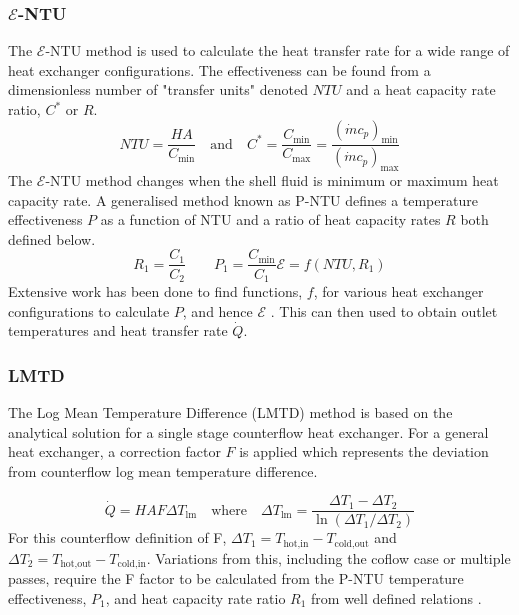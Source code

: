 \documentclass{article}
\begin{document}
\subsubsection{$\mathcal{E}$-NTU}
The $\mathcal{E}$-NTU method is used to calculate the heat transfer rate for a wide range of heat exchanger configurations.
The effectiveness can be found from a dimensionless number of "transfer units" denoted $NTU$ and a heat capacity rate ratio, $C^*$ or $R$.
\begin{equation}
  NTU = \frac{HA}{C_{\text{min}}} \quad \text{and} \quad C^* = \frac{C_{\text{min}}}{C_{\text{max}}} = \frac{(\dot{m}c_p)_{\text{min}}}{(\dot{m}c_p)_{\text{max}}}
\end{equation}
The $\mathcal{E}$-NTU method changes when the shell fluid is minimum or maximum heat capacity rate.
A generalised method known as P-NTU defines a temperature effectiveness $P$ as a function of NTU and a ratio of heat capacity rates $R$ both defined below.
\begin{equation}
   R_1 = \frac{C_1}{C_2} \quad \quad P_1 = \frac{C_\text{min}}{C_1} \mathcal{E} = f(NTU, R_1)
\end{equation}
Extensive work has been done to find functions, $f$, for various heat exchanger configurations to calculate $P$, and hence $\mathcal{E}$ \cite{HeatTransfer}.
This can then used to obtain outlet temperatures and heat transfer rate $\dot{Q}$.


\subsubsection{LMTD}

The Log Mean Temperature Difference (LMTD) method is based on the analytical solution for a single stage counterflow heat exchanger.
For a general heat exchanger, a correction factor $F$ is applied which represents the deviation from counterflow log mean temperature difference.

\begin{equation}
  \dot{Q} = HAF \Delta T_{\text{lm}} \quad \text{where} \quad \Delta T_{\text{lm}} = \frac{\Delta T_1 - \Delta T_2}{\ln(\Delta T_1 / \Delta T_2)}
\end{equation}
For this counterflow definition of F, $\Delta T_1 = T_{\text{hot,in}} - T_{\text{cold,out}}$ and $\Delta T_2 = T_{\text{hot,out}} - T_{\text{cold,in}}$.
Variations from this, including the coflow case or multiple passes, require the F factor to be calculated from the P-NTU temperature effectiveness, $P_1$, and heat capacity rate ratio $R_1$
from well defined relations \cite{HeatTransfer}.
\end{document}
